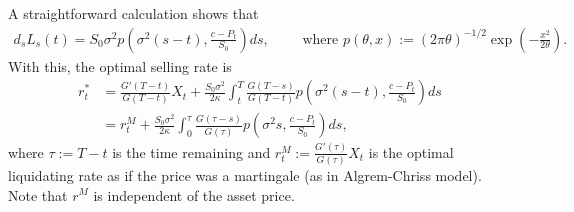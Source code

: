 \documentclass[openany,oneside]{article}
\theoremstyle{definition}
\theoremstyle{remark}
\newcommand{\ts}{\textstyle}
\begin{document}
{\color{red}
A straightforward calculation shows that
\begin{align*}
\ts d_s L_s(t) = S_0\sigma^2 p\left(\sigma^2(s-t),\frac{c-P_t}{S_0}\right) ds, \qquad \textrm{ where } p(\theta,x):=(2\pi\theta)^{-1/2}\exp\left(-\frac{x^2}{2\theta}\right).
\end{align*}
With this, the optimal selling rate is
\begin{align*}
r^\ast_t &\ts= \frac{G'(T-t)}{G(T-t)}X_t + \frac{S_0\sigma^2}{2\kappa}\int_t^T \frac{G(T-s)}{G(T-t)}p\left(\sigma^2(s-t),\frac{c-P_t}{S_0}\right) ds \\
&\ts = r^M_t + \frac{S_0\sigma^2}{2\kappa}\int_0^\tau \frac{G(\tau-s)}{G(\tau)}p\left(\sigma^2 s, \frac{c-P_t}{S_0}\right) ds,
\end{align*}
where $\tau:=T-t$ is the time remaining and $r^M_t:=\frac{G'(\tau)}{G(\tau)}X_t$ is the optimal liquidating rate as if the price was a martingale (as in Algrem-Chriss model). Note that $r^M$ is independent of the asset price.
}
\end{document}
